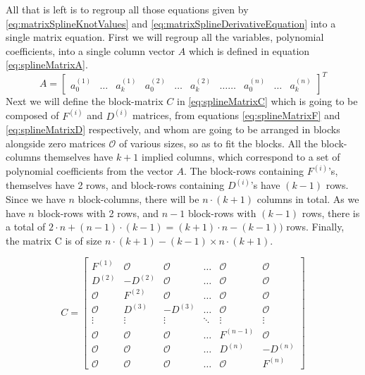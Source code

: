 \documentclass[12pt, a4paper]{article}
\begin{document}
All that is left is to regroup all those equations given by \eqref{eq:matrixSplineKnotValues} and \eqref{eq:matrixSplineDerivativeEquation} into a single matrix equation. First we will regroup all the variables, polynomial coefficients, into a single column vector \( A \) which is defined in equation \eqref{eq:splineMatrixA}.
\begin{equation} \label{eq:splineMatrixA}
    A = 
    \begin{bmatrix}
    a_0^{(1)} & \ldots & a_k^{(1)} & a_0^{(2)} & \ldots & a_k^{(2)} & \ldots \ldots & a_0^{(n)} & \ldots & a_k^{(n)}
    \end{bmatrix}^T
\end{equation}
\noindent Next we will define the block-matrix \( C \) in \eqref{eq:splineMatrixC} which is going to be composed of \( F^{(i)} \) and \( D^{(i)} \) matrices, from equations \eqref{eq:splineMatrixF} and \eqref{eq:splineMatrixD} respectively, and whom are going to be arranged in blocks alongside zero matrices \( \mathcal{O}\) of various sizes, so as to fit the blocks. All the block-columns themselves have \(k+1\) implied columns, which correspond to a set of polynomial coefficients from the vector \( A\). The block-rows containing \( F^{(i)} \)'s, themselves have 2 rows, and block-rows containing \( D^{(i)} \)'s have \((k-1)\) rows. Since we have \( n\) block-columns, there will be \( n\cdot(k+1)\) columns in total. As we have \( n\) block-rows with 2 rows, and \( n-1 \) block-rows with \( (k-1)\) rows, there is a total of \( 2\cdot n + (n-1)\cdot(k-1) = (k+1)\cdot n - (k-1))\) rows. Finally, the matrix C is of size \( n\cdot(k+1)-(k-1)\times n\cdot(k+1) \).\par
\begin{equation} \label{eq:splineMatrixC}
    C = 
    \begin{bmatrix}
        F^{(1)} & \mathcal{O} & \mathcal{O} & \ldots & \mathcal{O} & \mathcal{O} \\
        D^{(2)} & -D^{(2)} & \mathcal{O} & \ldots & \mathcal{O} & \mathcal{O} \\
        \mathcal{O} & F^{(2)} & \mathcal{O} & \ldots & \mathcal{O} & \mathcal{O}\\
        \mathcal{O} & D^{(3)} & -D^{(3)} & \ldots & \mathcal{O} & \mathcal{O}\\
        \vdots & \vdots & \vdots & \ddots & \vdots & \vdots \\
        \mathcal{O} & \mathcal{O} & \mathcal{O} & \ldots & F^{(n-1)} & \mathcal{O}\\
        \mathcal{O} & \mathcal{O} & \mathcal{O} & \ldots & D^{(n)} & -D^{(n)}\\
        \mathcal{O} & \mathcal{O} & \mathcal{O} & \ldots & \mathcal{O} &F^{(n)}
    \end{bmatrix}
\end{equation}
\end{document}
